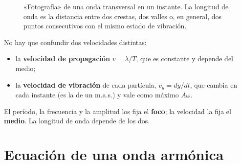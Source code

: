 \begin{figure}[H]
    \centering
    \caption{«Fotografía» de una onda transversal en un instante. La longitud de onda es la distancia entre dos crestas, dos
    valles o, en general, dos puntos consecutivos con el mismo estado de vibración.}
    \label{fig:ond-foto}
\end{figure}

\begin{remark}
    No hay que confundir dos velocidades distintas:
    \begin{itemize}
        \item la \textbf{velocidad de propagación} \(v = \lambda/T\), que es constante y depende del medio;
        \item la \textbf{velocidad de vibración} de cada partícula, \(v_y = dy/dt\), que cambia en cada instante (es la de un
        m.a.s.) y vale como máximo \(A\omega\).
    \end{itemize}
    El período, la frecuencia y la amplitud los fija el \textbf{foco}; la velocidad la fija el \textbf{medio}. La longitud
    de onda depende de los dos.
\end{remark}

\section{Ecuación de una onda armónica}\label{sec:ond-ecuacion}

